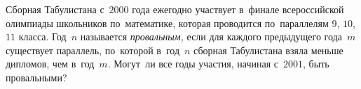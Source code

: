 \begin{problems}
\item
Сборная Табулистана с~$2000$ года ежегодно участвует в~финале всероссийской
олимпиады школьников по~математике, которая проводится по~параллелям
$9$, $10$, $11$ класса.
Год~$n$ называется \emph{провальным,} если для каждого предыдущего года~$m$
существует параллель, по~которой в~год~$n$ сборная Табулистана взяла меньше
дипломов, чем в~год~$m$.
Могут~ли все годы участия, начиная с~$2001$, быть провальными?








\end{problems}
